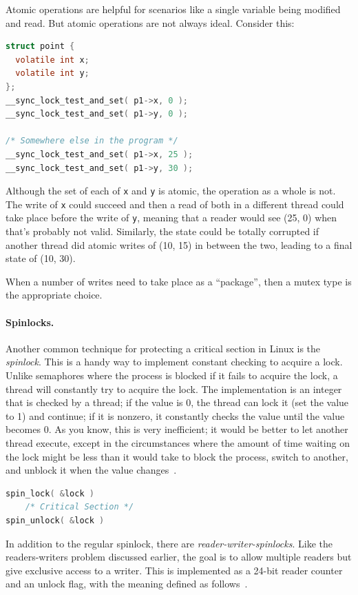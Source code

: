 \documentclass[a4paper]{report}
\begin{document}
Atomic operations are helpful for scenarios like a single variable being modified and read. But atomic operations are not always ideal. Consider this:

\begin{lstlisting}[language=C]
struct point {
  volatile int x;
  volatile int y;
};
__sync_lock_test_and_set( p1->x, 0 );
__sync_lock_test_and_set( p1->y, 0 );

/* Somewhere else in the program */
__sync_lock_test_and_set( p1->x, 25 );
__sync_lock_test_and_set( p1->y, 30 );
\end{lstlisting}

Although the set of each of \texttt{x} and \texttt{y} is atomic, the operation as a whole is not. The write of \texttt{x} could succeed and then a read of both in a different thread could take place before the write of \texttt{y}, meaning that a reader would see (25, 0) when that's probably not valid. Similarly, the state could be totally corrupted if another thread did atomic writes of (10, 15) in between the two, leading to a final state of (10, 30).

When a number of writes need to take place as a ``package'', then a mutex type is the appropriate choice.

\paragraph{Spinlocks.}
Another common technique for protecting a critical section in Linux is the \textit{spinlock}. This is a handy way to implement constant checking to acquire a lock. Unlike semaphores where the process is blocked if it fails to acquire the lock, a thread will constantly try to acquire the lock. The implementation is an integer that is checked by a thread; if the value is 0, the thread can lock it (set the value to 1) and continue; if it is nonzero, it constantly checks the value until the value becomes 0. As you know, this is very inefficient; it would be better to let another thread execute, except in the circumstances where the amount of time waiting on the lock might be less than it would take to block the process, switch to another, and unblock it when the value changes~\cite{osi}.

\begin{lstlisting}[language=C]
spin_lock( &lock )
    /* Critical Section */
spin_unlock( &lock )
\end{lstlisting}

In addition to the regular spinlock, there are \textit{reader-writer-spinlocks}. Like the readers-writers problem discussed earlier, the goal is to allow multiple readers but give exclusive access to a writer. This is implemented as a 24-bit reader counter and an unlock flag, with the meaning defined as follows~\cite{osi}.
\end{document}

